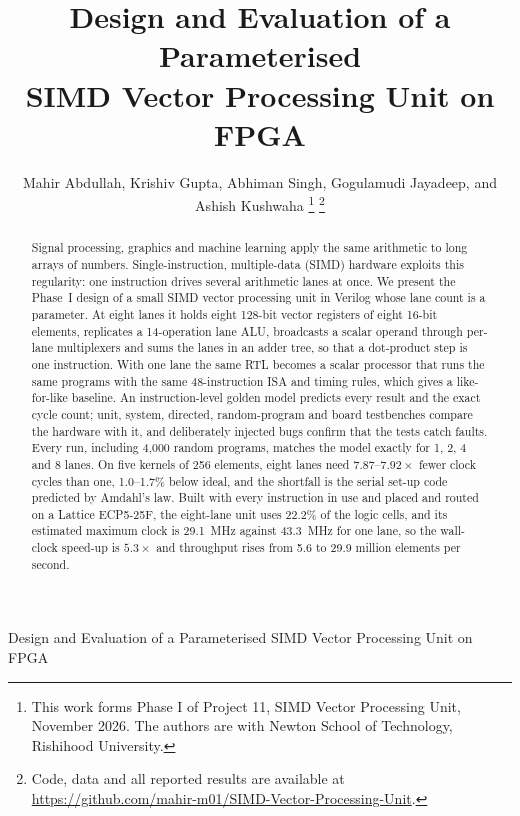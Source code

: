 \documentclass[journal]{IEEEtran}
\newcommand{\x}{\ensuremath{\times}}
\begin{document}
\title{Design and Evaluation of a Parameterised\\SIMD Vector Processing Unit on FPGA}

\author{Mahir Abdullah, Krishiv Gupta, Abhiman Singh, Gogulamudi Jayadeep, and Ashish Kushwaha%
\thanks{This work forms Phase I of Project 11, SIMD Vector Processing Unit, November 2026.
The authors are with Newton School of Technology, Rishihood University.}%
\thanks{Code, data and all reported results are available at
\url{https://github.com/mahir-m01/SIMD-Vector-Processing-Unit}.}}

%
{Design and Evaluation of a Parameterised SIMD Vector Processing Unit on FPGA}

\maketitle

\begin{abstract}
Signal processing, graphics and machine learning apply the same arithmetic to long
arrays of numbers. Single-instruction, multiple-data (SIMD) hardware exploits this
regularity: one instruction drives several arithmetic lanes at once. We present the
Phase~I design of a small SIMD vector processing unit in Verilog whose lane count is
a parameter. At eight lanes it holds eight 128-bit vector registers of eight 16-bit
elements, replicates a 14-operation lane ALU, broadcasts a scalar operand through
per-lane multiplexers and sums the lanes in an adder tree, so that a dot-product step
is one instruction. With one lane the same RTL becomes a scalar processor that runs
the same programs with the same 48-instruction ISA and timing rules, which gives a
like-for-like baseline. An instruction-level golden model predicts every result and
the exact cycle count; unit, system, directed, random-program and board testbenches
compare the hardware with it, and deliberately injected bugs confirm that the tests
catch faults. Every run, including 4,000 random programs, matches the model exactly
for 1, 2, 4 and 8 lanes. On five kernels of 256
elements, eight lanes need $7.87$--$7.92\x$ fewer clock cycles than one, 1.0--1.7\%
below ideal, and the shortfall is the serial set-up code predicted by Amdahl's law.
Built with every instruction in use and placed and routed on a Lattice ECP5-25F, the
eight-lane unit uses 22.2\% of the logic cells, and its estimated maximum clock is
29.1~MHz against 43.3~MHz for one lane, so the wall-clock speed-up is $5.3\x$ and
throughput rises from 5.6 to 29.9 million elements per second.
\end{abstract}
\end{document}
